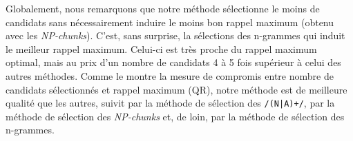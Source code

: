         \begin{table}[!h]
          \centering
          \caption{Résultats de l'évaluation intrinsèque des méthodes de
                   sélection des termes-clés candidats sur les collections
                   \textsc{De}ft, SemEval et \textsc{Duc}
                   \label{tab:candidate_extraction_statistics_deft_semeval_duc}}
        \end{table}
        
        Globalement, nous remarquons que notre méthode sélectionne le moins de
        candidats sans nécessairement induire le moins bon rappel maximum
        (obtenu avec les \textit{NP-chunks}).
        C'est, sans surprise, la sélections des n-grammes qui induit le meilleur
        rappel maximum. Celui-ci est très proche du rappel maximum optimal, mais
        au prix d'un nombre de candidats 4 à 5 fois supérieur à celui des autres
        méthodes. Comme le montre la mesure de compromis entre nombre de
        candidats sélectionnés et rappel maximum (QR), notre méthode
        est de meilleure qualité que les autres, suivit par la méthode de
        sélection des \texttt{/(N|A)+/}, par la méthode de sélection des
        \textit{NP-chunks} et, de loin, par la méthode de sélection des
        n-grammes.

